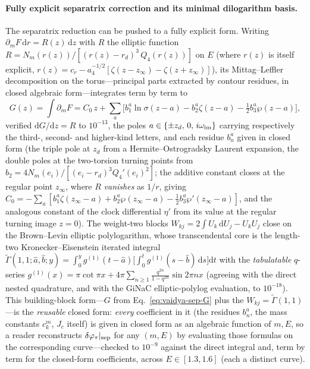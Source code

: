 \documentclass[12pt]{iopart}
\newcommand{\Jc}{J_{c}}
\newcommand{\dd}{\mathrm{d}}
\begin{document}
\paragraph{Fully explicit separatrix correction and its minimal dilogarithm basis.}
The separatrix reduction can be pushed to a fully explicit form. Writing
$\partial_m F\,\dd r=R(z)\,\dd z$ with $R$ the elliptic function
$R=N_m(r(z))/[(r(z)-r_d)^3\,Q_4(r(z))]$ on $E$ (where $r(z)$ is itself explicit,
$r(z)=c_r-a_4^{-1/2}[\zeta(z-z_\infty)-\zeta(z+z_\infty)]$), its Mittag--Leffler
decomposition on the torus---principal parts extracted by contour residues, in
closed algebraic form---integrates term by term to
\begin{equation}
    G(z)=\int\partial_m F=C_0\,z+\sum_a\Big[b_1^a\ln\sigma(z-a)-b_2^a\zeta(z-a)
        -\tfrac12 b_3^a\wp(z-a)\Big],
    \label{eq:vaidya-sep-G}
\end{equation}
verified $\dd G/\dd z=R$ to $10^{-13}$, the poles $a\in\{\pm z_d,\,0,\,i\omega_{\rm im}\}$
carrying respectively the third-, second- and higher-kind letters, and each residue
$b_n^a$ given in closed form (the triple pole at $z_d$ from a Hermite--Ostrogradsky
Laurent expansion, the double poles at the two-torsion turning points from
$b_2=4N_m(e_i)/[(e_i-r_d)^3 Q_4'(e_i)^2]$; the additive constant closes at the
regular point $z_\infty$, where $R$ \emph{vanishes} as $1/r$, giving
$C_0=-\sum_a[b_1^a\zeta(z_\infty-a)+b_2^a\wp(z_\infty-a)-\tfrac12 b_3^a
\wp'(z_\infty-a)]$, and the analogous constant of the clock differential
$\eta'$ from its value at the regular turning image $z=0$). The weight-two blocks
$W_{kj}=2\int U_k\,\dd U_j-U_kU_j$ close on the Brown--Levin elliptic
polylogarithm, whose transcendental core is the length-two Kronecker--Eisenstein
iterated integral~\cite{BrownLevin2011}
$\tilde\Gamma(1,1;\hat a,\hat b;y)=\int_0^y g^{(1)}(t-\hat a)\big[\int_0^t
g^{(1)}(s-\hat b)\,\dd s\big]\dd t$ with the \emph{tabulatable} $q$-series
$g^{(1)}(x)=\pi\cot\pi x+4\pi\sum_{n\ge1}\frac{q^{2n}}{1-q^{2n}}\sin 2\pi n x$
(agreeing with the direct nested quadrature, and with the GiNaC elliptic-polylog
evaluation, to $10^{-18}$). This building-block form---$G$ from
Eq.~\eqref{eq:vaidya-sep-G} plus the $W_{kj}=\tilde\Gamma(1,1)$---is the
\emph{reusable} closed form: \emph{every} coefficient in it (the residues $b_n^a$,
the mass constants $c_k^m$, $\Jc$ itself) is given in closed form as an algebraic
function of $m,E$, so a reader reconstructs $\delta\varphi_\tau|_{\rm sep}$ for any
$(m,E)$ by evaluating those formulas on the corresponding curve---checked to
$10^{-9}$ against the direct integral and, term by term for the closed-form
coefficients, across $E\in[1.3,1.6]$ (each a distinct curve).
\end{document}
